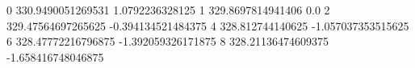 0 330.9490051269531 1.0792236328125
1 329.8697814941406 0.0
2 329.47564697265625 -0.394134521484375
4 328.812744140625 -1.057037353515625
6 328.47772216796875 -1.392059326171875
8 328.21136474609375 -1.658416748046875
